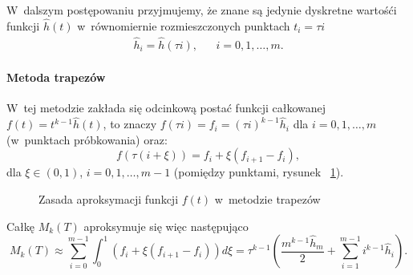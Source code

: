 \documentclass[paper=a4,DIV=12]{lpas}
\begin{document}
\begin{appendices}
  W~dalszym postępowaniu przyjmujemy, że znane są jedynie dyskretne wartośći
  funkcji $\hat{h}(t)$ w~równomiernie rozmieszczonych punktach $t_i = \tau i$
  \begin{equation}
    \begin{aligned}
      & \hat{h}_i = \hat{h}(\tau i), && i = 0, 1, \dots, m.&
    \end{aligned}
    \label{eq:0XLVC}
  \end{equation}

  \paragraph{Metoda trapezów} W~tej metodzie zakłada się odcinkową postać
  funkcji całkowanej $f(t) = t^{k-1} \hat{h}(t)$, to znaczy $f(\tau i) = f_i =
  (\tau i)^{k-1} \hat{h}_i$ dla $i=0,1,\dots,m$ (w~punktach próbkowania) oraz:
  \begin{equation}
    f\left(\tau (i + \xi)\right) = f_i + \xi (f_{i+1} - f_i),
    \label{eq:CV1AT}
  \end{equation}
  dla $\xi \in (0, 1)$, $i = 0, 1, \dots, m - 1$ (pomiędzy punktami, rysunek
  ~\ref{fig:Z319K}).
  \begin{figure}[!ht]
    \centering
    
    \caption{Zasada aproksymacji funkcji $f(t)$ w~metodzie trapezów}
    \label{fig:Z319K}
  \end{figure}
  Całkę $M_k(T)$ aproksymuje się więc następująco
  \begin{equation}
    M_k(T)
    \approx \sum_{i=0}^{m-1} {\int_0^1 {\left(f_i + \xi (f_{i+1} - f_i)\right) d\xi}}
    = \tau^{k-1} \left(
        \frac{m^{k-1} \hat{h}_m}{2} + \sum_{i=1}^{m-1} {i^{k-1} \hat{h}_i}
        \right).
    \label{eq:HNVFS}
  \end{equation}
\end{appendices}

\end{document}
